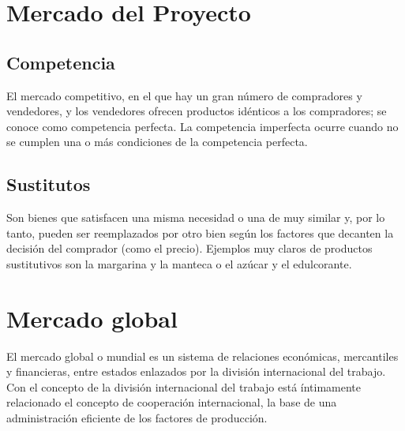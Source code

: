 \documentclass[../main]{subfiles}
\begin{document}
\section{Mercado del Proyecto}
\subsection{Competencia}
El mercado competitivo, en el que hay un gran número de compradores y
vendedores, y los vendedores ofrecen productos idénticos a los
compradores; se conoce como competencia perfecta. La competencia
imperfecta ocurre cuando no se cumplen una o más condiciones de la
competencia perfecta.
\subsection{Sustitutos}
Son bienes que satisfacen una misma necesidad o una de muy similar y,
por lo tanto, pueden ser reemplazados por otro bien según los
factores que decanten la decisión del comprador (como el precio).
Ejemplos muy claros de productos sustitutivos son la margarina y la
manteca o el azúcar y el edulcorante.
\section{Mercado global}
El mercado global o mundial es un sistema de relaciones económicas,
mercantiles y financieras, entre estados enlazados por la división
internacional del trabajo. Con el concepto de la división
internacional del trabajo está íntimamente relacionado el concepto de
cooperación internacional, la base de una administración eficiente de
los factores de producción.
\end{document}
